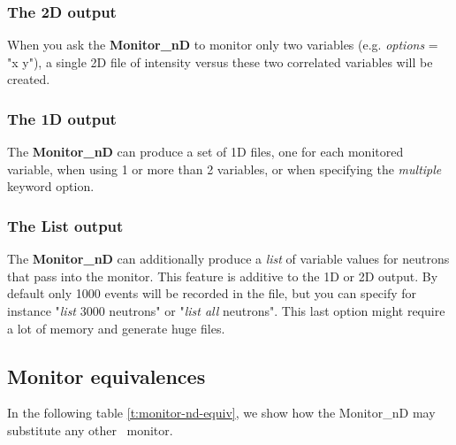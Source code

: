 \subsubsection{The 2D output}

When you ask the \textbf{Monitor\_nD} to monitor only two variables (e.g.
\textit{options} = "x y"), a single 2D file of intensity versus these two
correlated variables will be created.

\subsubsection{The 1D output}

The \textbf{Monitor\_nD} can produce a set of 1D files, one for each
monitored variable, when using 1 or more than 2 variables, or when
specifying the \textit{multiple} keyword option.

\subsubsection{The List output}

The \textbf{Monitor\_nD} can additionally produce a \textit{list} of variable
values for neutrons that pass into the monitor. This feature is additive
to the 1D or 2D output. By default only 1000 events will be recorded in
the file, but you can specify for instance "\textit{list} 3000 neutrons" or
"\textit{list all} neutrons". This last option might require a lot of
memory and generate huge files.

\subsection{Monitor equivalences}

In the following table \ref{t:monitor-nd-equiv}, we show how the Monitor\_nD may substitute any other \MCS\ monitor.

